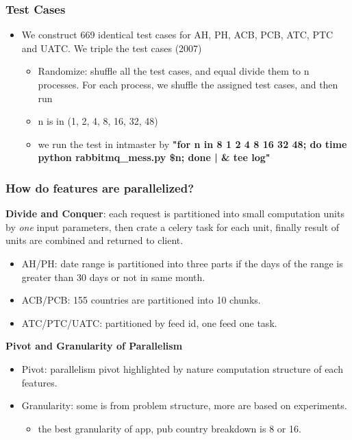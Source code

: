 \documentclass{beamer}
\begin{document}
\begin{frame}
\frametitle{Test Cases}
\begin{itemize}
\item We construct 669 identical test cases for AH, PH, ACB, PCB, ATC, PTC and UATC. We triple the test cases (2007)
	\begin{itemize}
	\item Randomize: shuffle all the test cases, and equal divide them to n processes. For each process, we shuffle the assigned test cases, and then run 
	\item n is in (1, 2, 4, 8, 16, 32, 48)
	\item we run the test in intmaster by \textbf{"for n in 8 1 2 4 8 16 32 48; do time python rabbitmq\_mess.py \$n; done | \& tee log"}
	\end{itemize}	
\end{itemize}
\end{frame}

\begin{frame}
\frametitle{How do features are parallelized?}
\textbf{Divide and Conquer}: each request is partitioned into small computation units by \textit{one} input parameters, then crate a celery task for each unit, finally result of units are combined and returned to client.
\begin{itemize}
\item AH/PH: date range is partitioned into three parts if the days of the range is greater than 30 days or not in same month.
\item ACB/PCB: 155 countries are partitioned into 10 chunks.
\item ATC/PTC/UATC: partitioned by feed id, one feed one task.
\end{itemize}
\textbf{Pivot and Granularity of Parallelism}
\begin{itemize}
\item Pivot: parallelism pivot highlighted by nature computation structure of each features.
\item Granularity: some is from problem structure, more are based on experiments. 
	\begin{itemize}
		\item the best granularity of {app, pub} country breakdown is 8 or 16.
	\end{itemize}
\end{itemize}
\end{frame}
\end{document}
